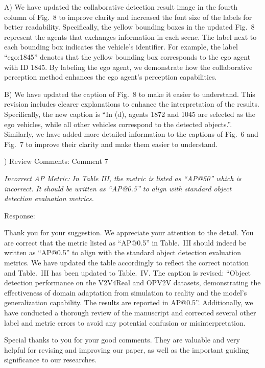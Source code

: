 \documentclass[12pt,a4paper]{article}
\begin{document}
A) We have updated the collaborative detection result image in the fourth column of Fig.~8 to improve clarity and increased the font size of the labels for better readability.
Specifically, the yellow bounding boxes in the updated Fig.~8 represent the agents that exchanges information in each scene. The label next to each bounding box indicates the vehicle's identifier. For example, the label ``ego:1845'' denotes that the yellow bounding box corresponds to the ego agent with ID 1845. By labeling the ego agent, we demonstrate how the collaborative perception method enhances the ego agent's perception capabilities.


B) We have updated the caption of Fig.~8 to make it easier to understand. This revision includes clearer explanations to enhance the interpretation of the results. Specifically, the new caption is ``In (d), agents 1872 and 1045 are selected as the ego vehicles, while all other vehicles correspond to the detected objects.''.
Similarly, we have added more detailed information to the captions of Fig.~6 and Fig.~7 to improve their clarity and make them easier to understand.


\vspace{4ex}
) Review Comments: Comment 7

\textit{Incorrect AP Metric: In Table III, the metric is listed as ``AP@50'' which is incorrect. It should be written as ``AP@0.5'' to align with standard object detection evaluation metrics.}

\noindent Response:

Thank you for your suggestion. We appreciate your attention to the detail. You are correct that the metric listed as ``AP@0.5'' in Table.~III should indeed be written as ``AP@0.5'' to align with the standard object detection evaluation metrics. We have updated the table accordingly to reflect the correct notation and Table.~III has been updated to Table.~IV. The caption is revised: ``Object detection performance on the V2V4Real and OPV2V datasets, demonstrating the effectiveness of domain adaptation from simulation to reality and the model's generalization capability. The results are reported in AP@0.5''.
Additionally, we have conducted a thorough review of the manuscript and corrected several other label and metric errors to avoid any potential confusion or misinterpretation.

\vspace{6ex}
Special thanks to you for your good comments. They are valuable and very helpful for revising and improving our paper, as well as the important guiding significance to our researches.
\end{document}
